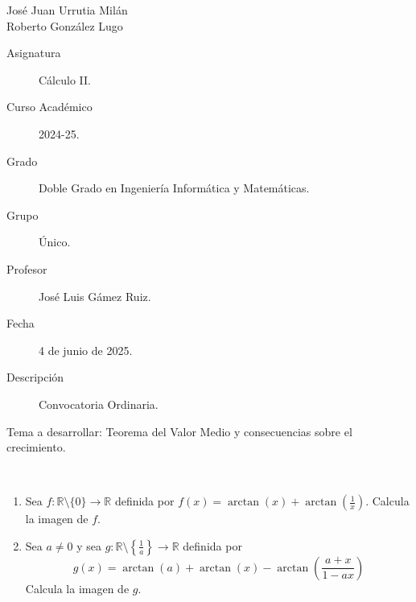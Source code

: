 \documentclass[12pt]{article}
\begin{document}

    
    
    {\begin{center}
        José Juan Urrutia Milán\\
        Roberto González Lugo
    \end{center}}

    \begin{description}
        \item[Asignatura] Cálculo II.
        \item[Curso Académico] 2024-25.
        \item[Grado] Doble Grado en Ingeniería Informática y Matemáticas.
        \item[Grupo] Único.
        \item[Profesor] José Luis Gámez Ruiz.
        \item[Fecha] 4 de junio de 2025.
        \item[Descripción] Convocatoria Ordinaria.
    \end{description}
    \newpage

    \begin{ejercicio}[2 puntos]
        Tema a desarrollar: Teorema del Valor Medio y consecuencias sobre el crecimiento.
    \end{ejercicio}

    \begin{ejercicio}[2 puntos]\ 
        \begin{enumerate}[label=\alph*)]
            \item Sea $f:\mathbb{R}\setminus \{0\}\longrightarrow \mathbb{R} $ definida por $f(x) = \arctan(x) + \arctan\left(\frac{1}{x}\right)$. Calcula la imagen de $f$.
            \item Sea $a\neq 0$ y sea $g:\mathbb{R}\setminus \left\{\frac{1}{a}\right\}\longrightarrow \mathbb{R}$ definida por
                \begin{equation*}
                    g(x) = \arctan(a) + \arctan(x) - \arctan\left(\dfrac{a+x}{1-ax}\right)
                \end{equation*}
                Calcula la imagen de $g$.
        \end{enumerate}
    \end{ejercicio}
\end{document}
